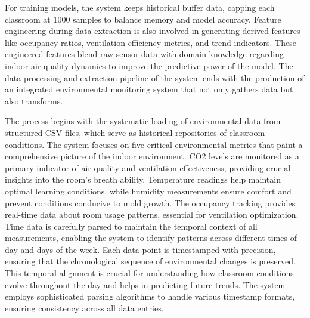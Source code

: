 For training models, the system keeps historical buffer data, capping each classroom at 1000 samples to balance memory and model accuracy. Feature engineering during data extraction is also involved in generating derived features like occupancy ratios, ventilation efficiency metrics, and trend indicators. These engineered features blend raw sensor data with domain knowledge regarding indoor air quality dynamics to improve the predictive power of the model. The data processing and extraction pipeline of the system ends with the production of an integrated environmental monitoring system that not only gathers data but also transforms.

The process begins with the systematic loading of environmental data from structured CSV files, which serve as historical repositories of classroom conditions. The system focuses on five critical environmental metrics that paint a comprehensive picture of the indoor environment. CO2 levels are monitored as a primary indicator of air quality and ventilation effectiveness, providing crucial insights into the room's breath ability. Temperature readings help maintain optimal learning conditions, while humidity measurements ensure comfort and prevent conditions conducive to mold growth. The occupancy tracking provides real-time data about room usage patterns, essential for ventilation optimization. Time data is carefully parsed to maintain the temporal context of all measurements, enabling the system to identify patterns across different times of day and days of the week. Each data point is timestamped with precision, ensuring that the chronological sequence of environmental changes is preserved. This temporal alignment is crucial for understanding how classroom conditions evolve throughout the day and helps in predicting future trends. The system employs sophisticated parsing algorithms to handle various timestamp formats, ensuring consistency across all data entries.

